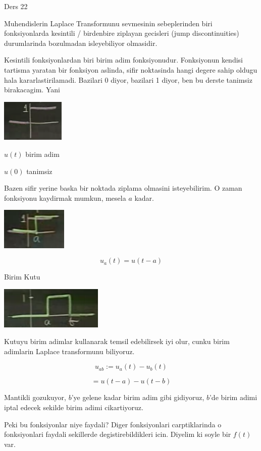 \documentclass[12pt,fleqn]{article}\usepackage{../common}
\begin{document}
Ders 22

Muhendislerin Laplace Transformunu sevmesinin sebeplerinden biri
fonksiyonlarda kesintili / birdenbire ziplayan gecisleri (jump
discontinuities) durumlarinda bozulmadan isleyebiliyor olmasidir. 

Kesintili fonksiyonlardan biri birim adim fonksiyonudur. Fonksiyonun
kendisi tartisma yaratan bir fonksiyon aslinda, sifir noktasinda hangi
degere sahip oldugu hala kararlastirilamadi. Bazilari 0 diyor, bazilari 1
diyor, ben bu derste tanimsiz birakacagim. Yani

\includegraphics[height=2cm]{22_1.png}

$u(t)$ birim adim

$u(0)$ tanimsiz

Bazen sifir yerine baska bir noktada ziplama olmasini isteyebilirim. O
zaman fonksiyonu kaydirmak mumkun, mesela $a$ kadar. 

\includegraphics[height=2cm]{22_2.png}

\[ u_a(t) = u(t-a) \]

Birim Kutu

\includegraphics[height=2cm]{22_3.png}

Kutuyu birim adimlar kullanarak temsil edebilirsek iyi olur, cunku
birim adimlarin Laplace transformunu biliyoruz. 

\[ u_{ab} := u_a(t) - u_b(t) \]

\[ = u(t-a) - u(t-b) \]

Mantikli gozukuyor, $b$'ye gelene kadar birim adim gibi gidiyoruz, $b$'de
birim adimi iptal edecek sekilde birim adimi cikartiyoruz. 

Peki bu fonksiyonlar niye faydali? Diger fonksiyonlari carptiklarinda o
fonksiyonlari faydali sekillerde degistirebildikleri icin. Diyelim ki soyle
bir $f(t)$ var.
\end{document}
